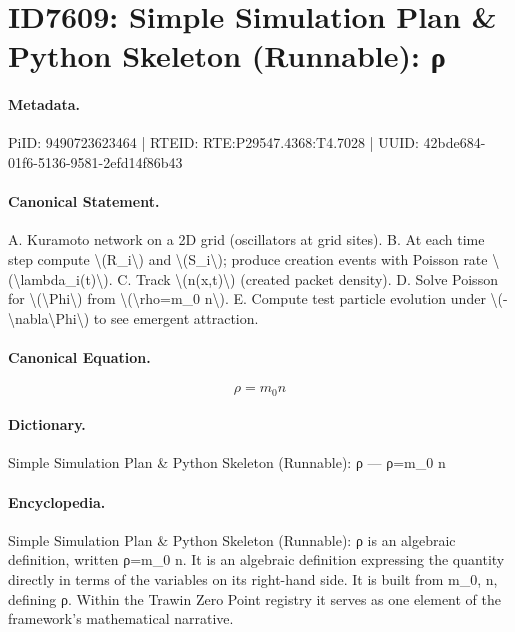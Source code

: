 \section*{ID7609: Simple Simulation Plan \& Python Skeleton (Runnable): ρ}
\paragraph{Metadata.}
PiID: 9490723623464 | RTEID: RTE:P29547.4368:T4.7028 | UUID: 42bde684-01f6-5136-9581-2efd14f86b43

\paragraph{Canonical Statement.}
A. Kuramoto network on a 2D grid (oscillators at grid sites). B. At each time step compute \textbackslash{}(R\_i\textbackslash{}) and \textbackslash{}(S\_i\textbackslash{}); produce creation events with Poisson rate \textbackslash{}(\textbackslash{}lambda\_i(t)\textbackslash{}). C. Track \textbackslash{}(n(x,t)\textbackslash{}) (created packet density). D. Solve Poisson for \textbackslash{}(\textbackslash{}Phi\textbackslash{}) from \textbackslash{}(\textbackslash{}rho=m\_0 n\textbackslash{}). E. Compute test particle evolution under \textbackslash{}(-\textbackslash{}nabla\textbackslash{}Phi\textbackslash{}) to see emergent attraction.

\paragraph{Canonical Equation.}
\[
\rho=m_0 n
\]

\paragraph{Dictionary.}
Simple Simulation Plan \& Python Skeleton (Runnable): ρ — ρ=m\_0 n

\paragraph{Encyclopedia.}
Simple Simulation Plan \& Python Skeleton (Runnable): ρ is an algebraic definition, written ρ=m\_0 n. It is an algebraic definition expressing the quantity directly in terms of the variables on its right-hand side. It is built from m\_0, n, defining ρ. Within the Trawin Zero Point registry it serves as one element of the framework's mathematical narrative.
